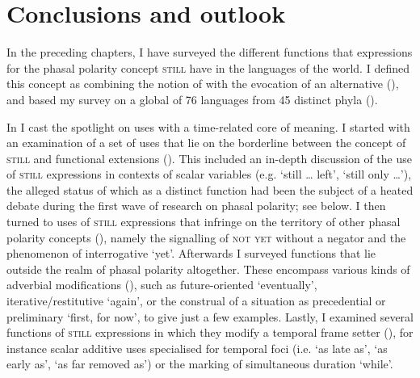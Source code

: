 \chapter{Conclusions and outlook}\label{chapter4}
In the preceding chapters, I have surveyed the different functions that expressions for the phasal polarity concept \textsc{still} have in the languages of the world. I defined this concept as combining the notion of  with the evocation of an alternative  (), and based my survey on a global  of 76 languages from 45 distinct phyla ().

In  I cast the spotlight on uses with a time-related core of meaning. I started with an examination of a set of uses that lie on the borderline between the concept of \textsc{still} and functional extensions (). This included an in-depth discussion of the use of \textsc{still} expressions in contexts of scalar variables (e.g. \lq still … left\rq{}, \lq still only …\rq), the alleged status of which as a distinct function had been the subject of a heated debate during the first wave of research on phasal polarity; see below. I then turned to uses of \textsc{still} expressions that infringe on the territory of other phasal polarity concepts (), namely the signalling of \textsc{not yet} without a negator and the phenomenon of interrogative \lq{}yet\rq{}. Afterwards I surveyed functions that lie outside the realm of phasal polarity altogether. These encompass various kinds of adverbial modifications (), such as future-oriented \lq eventually\rq{}, iterative/restitutive \lq again\rq{}, or the construal of a situation as precedential or preliminary \lq first, for now\rq{}, to give just a few examples. Lastly, I examined several functions of \textsc{still} expressions in which they modify a temporal frame setter (), for instance scalar additive uses specialised for temporal foci (i.e. \lq as late as\rq{}, \lq{}as early as\rq{}, \lq{}as far removed as\rq{}) or the marking of simultaneous duration \lq{}while\rq{}.


